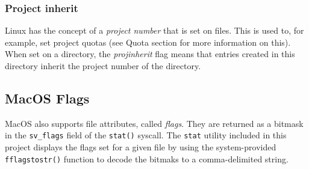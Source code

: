 \documentclass[a4paper]{article}
\begin{document}
\subsubsection{Project inherit}

Linux has the concept of a \emph{project number} that is set on files. This is used to, for example, set project quotas (see Quota section for more information on this). When set on a directory, the \emph{projinherit} flag means that entries created in this directory inherit the project number of the directory.

\subsection{MacOS Flags}



MacOS also supports file attributes, called \emph{flags}. They are returned as a bitmask in the \verb|sv_flags| field of the \verb|stat()| syscall. The \verb|stat| utility included in this project displays the flags set for a given file by using the system-provided \verb|fflagstostr()| function to decode the bitmaks to a comma-delimited string.
\end{document}
